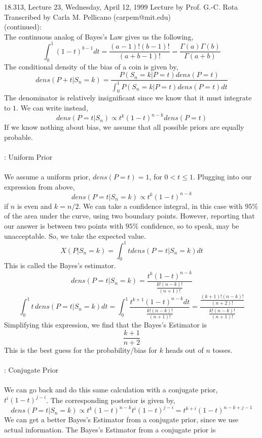 {\Large 18.313, Lecture 23, Wednesday, April 12, 1999}\newline
{\large Lecture by Prof. G.-C. Rota}\\
Transcribed by Carla M. Pellicano (carpem@mit.edu)\\

 (continued):\\

\noindent The continuous analog of Bayes's Law gives us the following,
$$\int_0^1(1-t)^{b-1}dt=\frac{(a-1)!(b-1)!}{(a+b-1)!}=\frac{\Gamma(a)\Gamma(b)}{\Gamma(a+b)}$$
The conditional density of the bias of a coin is given by,
$$dens(P+t|S_n=k)=\frac{P(S_n=k|P=t)dens(P=t)}{\int_0^1P(S_n=k|P=t)dens(P=t)dt}$$
The denominator is relatively insignificant since we know that it must integrate to $1$.  We can write instead, 
$$dens(P=t|S_n)\propto t^k(1-t)^{n-k}dens(P=t)$$
If we know nothing about bias, we assume that all possible priors are equally probable.\\\\
: Uniform Prior\\\\
We assume a uniform prior, $dens(P=t)=1$, for $0<t\leq 1$.  Plugging into our expression from above,
$$dens(P=t|S_n=k)\propto t^k(1-t)^{n-k}$$
if $n$ is even and $k=n/2$.  We can take a confidence integral, in this case with $95\%$ of the area under the curve, using two boundary points.  However, reporting that our answer is between two points with $95\%$ confidence, so to speak, may be unacceptable.  So, we take the expected value.  
$$X(P|S_n=k)=\int_0^1 tdens(P=t|S_n=k)dt$$
This is called the Bayes's estimator.
$$dens(P=t|S_n=k)=\frac{t^k(1-t)^{n-k}}{\frac{k!(n-k)!}{(n+1)!}}$$
$$\int_0^1 t\,dens(P=t|S_n=k)dt=\int_0^1 \frac{t^{k+1}(1-t)^{n-k}dt}{\frac{k!(n-k)!}{(n+1)!}}=\frac{\frac{(k+1)!(n-k)!}{(n+2)!}}{\frac{k!(n-k)!}{(n+1)!}}$$
Simplifying this expression, we find that the Bayes's Estimator is
$$\frac{k+1}{n+2}$$
This is the best guess for the probability/bias for $k$ heads out of $n$ tosses.  \\\\
: Conjugate Prior\\\\
We can go back and do this same calculation with a conjugate prior, $t^i(1-t)^{j-i}$.  The corresponding posterior is given by,
$$dens(P=t|S_n=k)\propto t^k(1-t)^{n-k}t^i(1-t)^{j-i}=t^{k+i}(1-t)^{n-k+j-1}$$
We can get a better Bayes's Estimator from a conjugate prior, since we use actual information.  The Bayes's Estimator from a conjugate prior is
